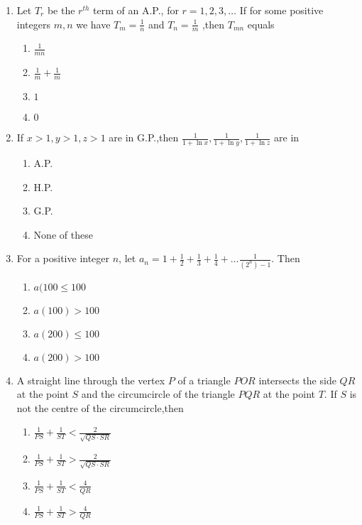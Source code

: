 \documentclass[journal]{IEEEtran}
\theoremstyle{remark}
\begin{document}
\begin{enumerate}
\item Let $T_r$ be the $r^{th}$ term of an A.P., for $r=1,2,3,\dots$ If for some positive integers $m,n$ we have
$T_m=\frac{1}{n}$ and $T_n=\frac{1}{m}$ ,then $T_{mn}$ equals \hfill{}

\begin{multicols}{4}
\begin{enumerate}
\item $\frac{1}{mn}$
\item $\frac{1}{m} + \frac{1}{m}$
\item $1$
\item $0$
\end{enumerate}
\end{multicols}

\item If $x>1,y>1,z>1$ are in G.P.,then $\frac{1}{1+\ln x},\frac{1}{1+\ln y},\frac{1}{1+\ln z}$ are in 
\hfill{}
\begin{multicols}{4}
\begin{enumerate}
\item A.P.
\item H.P.
\item G.P.
\item None of these
\end{enumerate}
\end{multicols}

\item For a positive integer $n$, let
$a_n=1+\frac{1}{2}+\frac{1}{3}+\frac{1}{4}+\dots\frac{1}{(2^n)-1}$. Then \hfill{}
\begin{multicols}{4}
\begin{enumerate}
\item $a(100\leq 100$
\item $a(100) > 100$
\item $a(200)\leq 100$
\item $a(200) > 100$
\end{enumerate}
\end{multicols}

\item A straight line through the vertex $P$ of a triangle $POR$ intersects the side $QR$ at the point $S$ and the circumcircle of the triangle $PQR$ at the point $T$. If $S$ is not the centre of the circumcircle,then  \hfill{}
\begin{multicols}{2}
\begin{enumerate}
\item $\frac{1}{PS}+\frac{1}{ST}<\frac{2}{\sqrt{QS \cdot SR}}$
\item $\frac{1}{PS}+\frac{1}{ST}>\frac{2}{\sqrt{QS \cdot SR}}$
\item $\frac{1}{PS}+\frac{1}{ST}<\frac{4}{QR}$
\item $\frac{1}{PS}+\frac{1}{ST}>\frac{4}{QR}$
\end{enumerate}
\end{multicols}


\end{enumerate}
\end{document}
